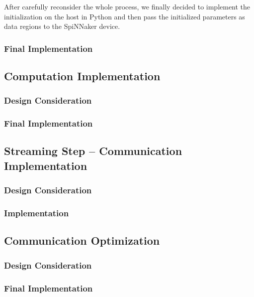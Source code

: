After carefully reconsider the whole process, we finally decided to implement the initialization on the host in Python and then pass the initialized parameters as data regions to the SpiNNaker device.
\subsubsection{Final Implementation}


\subsection{Computation Implementation} \label{sec:cp}
\subsubsection{Design Consideration}
\subsubsection{Final Implementation}

\subsection{Streaming Step -- Communication Implementation} \label{sec:ssc}
\subsubsection{Design Consideration}
\subsubsection{Implementation}

\subsection{Communication Optimization}
\subsubsection{Design Consideration}
\subsubsection{Final Implementation}